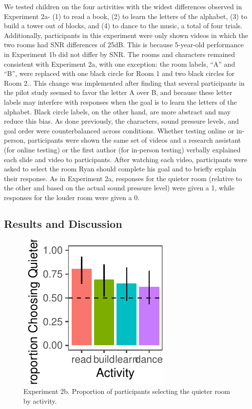 \documentclass[10pt, letterpaper]{article}
\newenvironment{CodeChunk}{}{}
\begin{document}
We tested children on the four activities with the widest differences
observed in Experiment 2a- (1) to read a book, (2) to learn the letters
of the alphabet, (3) to build a tower out of blocks, and (4) to dance to
the music, a total of four trials. Additionally, participants in this
experiment were only shown videos in which the two rooms had SNR
differences of 25dB. This is because 5-year-old performance in
Experiment 1b did not differ by SNR. The rooms and characters remained
consistent with Experiment 2a, with one exception: the room labels,
``A'' and ``B'', were replaced with one black circle for Room 1 and two
black circles for Room 2.. This change was implemented after finding
that several participants in the pilot study seemed to favor the letter
A over B, and because these letter labels may interfere with responses
when the goal is to learn the letters of the alphabet. Black circle
labels, on the other hand, are more abstract and may reduce this bias.
As done previously, the characters, sound pressure levels, and goal
order were counterbalanced across conditions. Whether testing online or
in-person, participants were shown the same set of videos and a research
assistant (for online testing) or the first author (for in-person
testing) verbally explained each slide and video to participants. After
watching each video, participants were asked to select the room Ryan
should complete his goal and to briefly explain their response. As in
Experiment 2a, responses for the quieter room (relative to the other and
based on the actual sound pressure level) were given a 1, while
responses for the louder room were given a 0.

\hypertarget{results-and-discussion-3}{%
\subsection{\texorpdfstring{\textbf{Results and
Discussion}}{Results and Discussion}}\label{results-and-discussion-3}}

\begin{CodeChunk}
\begin{figure}[H]

{\centering \includegraphics{figs/unnamed-chunk-4-1} 

}

\caption[Experiment 2b]{Experiment 2b. Proportion of participants selecting the quieter room by activity.}\label{fig:unnamed-chunk-4}
\end{figure}
\end{CodeChunk}
\end{document}
